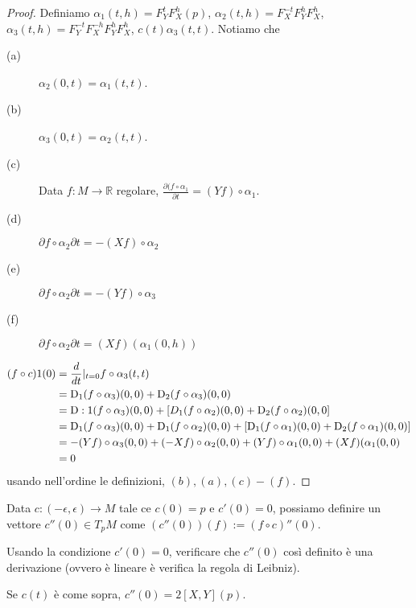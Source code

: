 \begin{proof}
 Definiamo $\alpha_1(t,h)=F_Y^tF_X^h(p)$, $\alpha_2(t,h)=F_X^{-t}F_Y^hF_X^h$, $\alpha_3(t,h)=F_Y^{-t}F_X^{-h}F_Y^hF_X^h$, $c(t)\alpha_3(t,t)$. Notiamo che
 \begin{description}
  \item[(a)] $\alpha_2(0,t)=\alpha_1(t,t)$.
  \item[(b)] $\alpha_3(0,t)=\alpha_2(t,t)$.
  \item[(c)] Data $f:M\to\mathbb{R}$ regolare, $\frac{\partial (f\circ\alpha_1}{\partial t}=(Yf)\circ\alpha_1$.
  \item[(d)] $\partial{f\circ\alpha_2}{\partial t}=-(Xf)\circ \alpha_2$
  \item[(e)] $\partial{f\circ\alpha_2}{\partial t}=-(Yf)\circ\alpha_3$
  \item[(f)] $\partial{f\circ\alpha_2}{\partial t}=(Xf)(\alpha_1(0,h))$
 \end{description}
 
 \begin{align*} (f\circ c)1(0)&=\frac{d}{dt}|_{t=0}f\circ\alpha_3(t,t)
 \\ &=\mathrm D_1(f\circ \alpha_3)(0,0)+\mathrm D_2(f\circ\alpha_3)(0,0)
 \\ &=\mathrm D:1(f\circ\alpha_3)(0,0)+\left[D_1(f\circ\alpha_2)(0,0)+\mathrm D_2(f\circ\alpha_2)(0,0\right]
 \\ &=\mathrm D_1(f\circ\alpha_3)(0,0)+\mathrm D_1(f\circ\alpha_2)(0,0)+\left[\mathrm D_1(f\circ\alpha_1)(0,0)+\mathrm D_2(f\circ\alpha_1)(0,0)\right]
 \\ &=-(Yf)\circ\alpha_3(0,0)+(-Xf)\circ\alpha_2(0,0)+(Yf)\circ\alpha_1(0,0)+(Xf)(\alpha_1(0,0)
 \\ &=0
\end{align*}
 usando nell'ordine le definizioni, $(b), (a), (c)-(f)$.
 
\end{proof}

\begin{proposition}
 Data $c:(-\epsilon,\epsilon)\to M$ tale ce $c(0)=p$ e $c'(0)=0$, possiamo definire un vettore $c''(0)\in T_pM$ come $(c''(0))(f):=(f\circ c)''(0)$.
\end{proposition}

\begin{exercise}
 Usando la condizione $c'(0)=0$, verificare che $c''(0)$  così definito è una derivazione (ovvero è lineare è verifica la regola di Leibniz).
\end{exercise}

\begin{theorem}
 Se $c(t)$ è come sopra, $c''(0)=2[X,Y](p)$.
\end{theorem}

